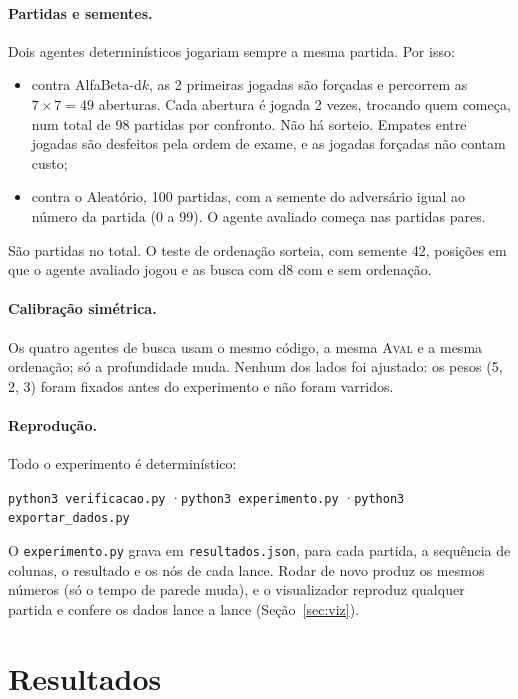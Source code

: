 \documentclass[11pt,a4paper]{article}
\newcommand{\fn}[1]{\textsc{#1}}            %
\newcommand{\arq}[1]{\texttt{#1}}
\begin{document}
\paragraph{Partidas e sementes.} Dois agentes determinísticos jogariam sempre a mesma partida. Por isso:
\begin{itemize}
  \item contra AlfaBeta-d$k$, as 2 primeiras jogadas são forçadas e percorrem as $7 \times 7 = 49$ aberturas. Cada
        abertura é jogada 2 vezes, trocando quem começa, num total de 98 partidas por confronto. Não há sorteio. Empates entre
        jogadas são desfeitos pela ordem de exame, e as jogadas forçadas não contam custo;
  \item contra o Aleatório, 100 partidas, com a semente do adversário igual ao número da partida (0 a 99). O
        agente avaliado começa nas partidas pares.
\end{itemize}
São  partidas no total. O teste de ordenação sorteia, com semente 42, 
posições em que o agente avaliado jogou e as busca com d8 com e sem ordenação.

\paragraph{Calibração simétrica.} Os quatro agentes de busca usam o mesmo código, a mesma \fn{Aval} e a mesma
ordenação; só a profundidade muda. Nenhum dos lados foi ajustado: os pesos (5, 2, 3) foram fixados antes do
experimento e não foram varridos.

\paragraph{Reprodução.} Todo o experimento é determinístico:
\begin{center}\small
\texttt{python3 verificacao.py} \quad·\quad \texttt{python3 experimento.py} \quad·\quad \texttt{python3 exportar\_dados.py}
\end{center}
O \arq{experimento.py} grava em \arq{resultados.json}, para cada partida, a sequência de colunas, o resultado e os nós
de cada lance. Rodar de novo produz os mesmos números (só o tempo de parede muda), e o visualizador
reproduz qualquer partida e confere os dados lance a lance (Seção~\ref{sec:viz}).

\section{Resultados}
\label{sec:resultados}
\end{document}
